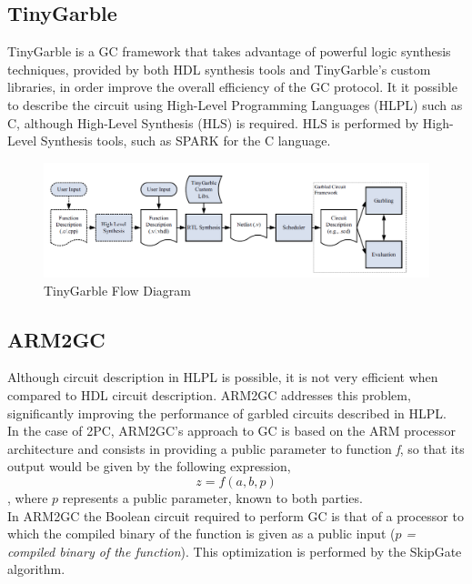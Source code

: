 \begin{refsection}
\subsection{TinyGarble}
TinyGarble is a GC framework that takes advantage of powerful logic synthesis techniques, provided by both HDL synthesis tools
and TinyGarble's custom libraries, in order improve the overall efficiency of the GC protocol.
It it possible to describe the circuit using High-Level Programming Languages (HLPL) such as C, although High-Level Synthesis (HLS) is required. HLS is performed by High-Level Synthesis tools, such as SPARK for the C language.

\renewcommand{\figurename}{Figure}
\begin{figure}[H]
\centering
\includegraphics[width=.9\linewidth]{./sdf/classical_mpc/figures/tinygarble_flow_diagram}
\caption{TinyGarble Flow Diagram}
\label{fig:tgdiagram}
\end{figure}

\subsection{ARM2GC}
Although circuit description in HLPL is possible, it is not very efficient when compared to HDL circuit description. ARM2GC addresses this problem, significantly improving the performance of garbled circuits described in HLPL.\\
In the case of 2PC, ARM2GC's approach to GC is based on the ARM processor architecture and consists in providing a public parameter to function \textit{f}, so that its output would be given by the following expression,
\begin{equation}\label{eq:arm2gc}
z = f(a,b,p)
\end{equation}
, where $p$ represents a public parameter, known to both parties.\\
In ARM2GC the Boolean circuit required to perform GC is that of a processor to which the compiled binary of the function is given as a public input ($p$\textit{ = compiled binary of the function}). This optimization is performed by the SkipGate algorithm.



\clearpage
\printbibliography[heading=subbibliography]
\end{refsection}
\cleardoublepage
